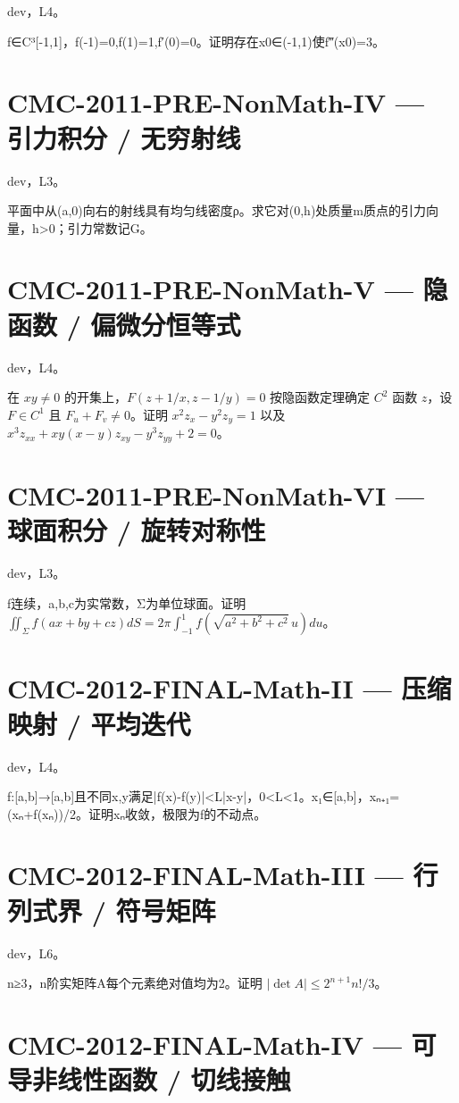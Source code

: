 \documentclass[UTF8]{ctexart}
\begin{document}
dev，L4。

f∈C³[-1,1]，f(-1)=0,f(1)=1,f′(0)=0。证明存在x0∈(-1,1)使f‴(x0)=3。

\section*{CMC-2011-PRE-NonMath-IV — 引力积分 / 无穷射线}

dev，L3。

平面中从(a,0)向右的射线具有均匀线密度ρ。求它对(0,h)处质量m质点的引力向量，h>0；引力常数记G。

\section*{CMC-2011-PRE-NonMath-V — 隐函数 / 偏微分恒等式}

dev，L4。

在 $xy\ne0$ 的开集上，$F(z+1/x,z-1/y)=0$ 按隐函数定理确定 $C^2$ 函数 $z$，设 $F\in C^1$ 且 $F_u+F_v\ne0$。证明 $x^2z_x-y^2z_y=1$ 以及 $x^3z_{xx}+xy(x-y)z_{xy}-y^3z_{yy}+2=0$。

\section*{CMC-2011-PRE-NonMath-VI — 球面积分 / 旋转对称性}

dev，L3。

f连续，a,b,c为实常数，Σ为单位球面。证明 $\iint_\Sigma f(ax+by+cz)dS=2\pi\int_{-1}^1f(\sqrt{a^2+b^2+c^2}\,u)du$。

\section*{CMC-2012-FINAL-Math-II — 压缩映射 / 平均迭代}

dev，L4。

f:[a,b]→[a,b]且不同x,y满足|f(x)-f(y)|<L|x-y|，0<L<1。x₁∈[a,b]，xₙ₊₁=(xₙ+f(xₙ))/2。证明xₙ收敛，极限为f的不动点。

\section*{CMC-2012-FINAL-Math-III — 行列式界 / 符号矩阵}

dev，L6。

n≥3，n阶实矩阵A每个元素绝对值均为2。证明 $|\det A|\le2^{n+1}n!/3$。

\section*{CMC-2012-FINAL-Math-IV — 可导非线性函数 / 切线接触}
\end{document}
